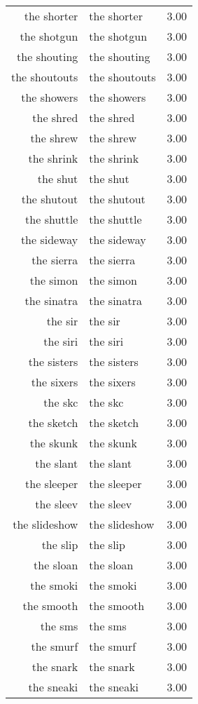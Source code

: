 \begin{table}[ht]
\begin{tabular}{rlr}
  the shorter & the shorter & 3.00 \\ 
  the shotgun & the shotgun & 3.00 \\ 
  the shouting & the shouting & 3.00 \\ 
  the shoutouts & the shoutouts & 3.00 \\ 
  the showers & the showers & 3.00 \\ 
  the shred & the shred & 3.00 \\ 
  the shrew & the shrew & 3.00 \\ 
  the shrink & the shrink & 3.00 \\ 
  the shut & the shut & 3.00 \\ 
  the shutout & the shutout & 3.00 \\ 
  the shuttle & the shuttle & 3.00 \\ 
  the sideway & the sideway & 3.00 \\ 
  the sierra & the sierra & 3.00 \\ 
  the simon & the simon & 3.00 \\ 
  the sinatra & the sinatra & 3.00 \\ 
  the sir & the sir & 3.00 \\ 
  the siri & the siri & 3.00 \\ 
  the sisters & the sisters & 3.00 \\ 
  the sixers & the sixers & 3.00 \\ 
  the skc & the skc & 3.00 \\ 
  the sketch & the sketch & 3.00 \\ 
  the skunk & the skunk & 3.00 \\ 
  the slant & the slant & 3.00 \\ 
  the sleeper & the sleeper & 3.00 \\ 
  the sleev & the sleev & 3.00 \\ 
  the slideshow & the slideshow & 3.00 \\ 
  the slip & the slip & 3.00 \\ 
  the sloan & the sloan & 3.00 \\ 
  the smoki & the smoki & 3.00 \\ 
  the smooth & the smooth & 3.00 \\ 
  the sms & the sms & 3.00 \\ 
  the smurf & the smurf & 3.00 \\ 
  the snark & the snark & 3.00 \\ 
  the sneaki & the sneaki & 3.00 \\ 

\end{tabular}
\end{table}
